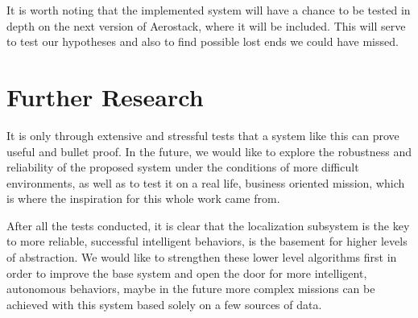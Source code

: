   It is worth noting that the implemented system will have a chance to be tested in depth on the next version of Aerostack, where it will be included. This will serve to test our hypotheses and also to find possible lost ends we could have missed.

\section{Further Research} \label{ch_6:sect:research}

  It is only through extensive and stressful tests that a system like this can prove useful and bullet proof. In the future, we would like to explore the robustness and reliability of the proposed system under the conditions of more difficult environments, as well as to test it on a real life, business oriented mission, which is where the inspiration for this whole work came from.

  After all the tests conducted, it is clear that the localization subsystem is the key to more reliable, successful intelligent behaviors, is the basement for higher levels of abstraction. We would like to strengthen these lower level algorithms first in order to improve the base system and open the door for more intelligent, autonomous behaviors, maybe in the future more complex missions can be achieved with this system based solely on a few sources of data.

\begin{comment}
\begin{itemize}
\end{itemize}
\end{comment}
